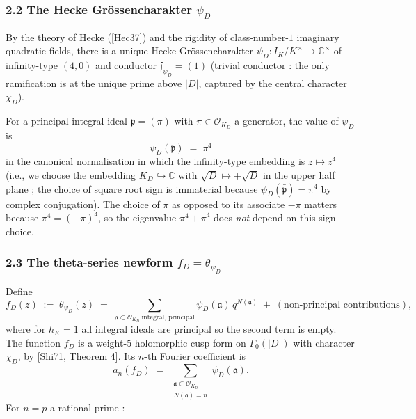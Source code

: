 \documentclass[
  11pt,
  a4paper,
]{amsart}
\begin{document}
\hypertarget{the-hecke-gruxf6ssencharakter-psi_d}{%
\subsubsection{\texorpdfstring{2.2 The Hecke Grössencharakter \(\psi_D\)}{2.2 The Hecke Grössencharakter \textbackslash psi\_D}}\label{the-hecke-gruxf6ssencharakter-psi_d}}

By the theory of Hecke ({[}Hec37{]}) and the rigidity of class-number-\(1\) imaginary quadratic fields, there is a unique Hecke Grössencharakter \(\psi_D : I_K / K^\times \to \mathbb{C}^\times\) of infinity-type \((4, 0)\) and conductor \(\mathfrak{f}_{\psi_D} = (1)\) (trivial conductor : the only ramification is at the unique prime above \(|D|\), captured by the central character \(\chi_D\)).

For a principal integral ideal \(\mathfrak{p} = (\pi)\) with \(\pi \in \mathcal{O}_{K_D}\) a generator, the value of \(\psi_D\) is
\[
\psi_D(\mathfrak{p}) \;=\; \pi^4
\]
in the canonical normalisation in which the infinity-type embedding is \(z \mapsto z^4\) (i.e., we choose the embedding \(K_D \hookrightarrow \mathbb{C}\) with \(\sqrt D \mapsto +\sqrt{D}\) in the upper half plane ; the choice of square root sign is immaterial because \(\psi_D(\bar{\mathfrak{p}}) = \bar\pi^4\) by complex conjugation). The choice of \(\pi\) as opposed to its associate \(-\pi\) matters because \(\pi^4 = (-\pi)^4\), so the eigenvalue \(\pi^4 + \bar\pi^4\) does \emph{not} depend on this sign choice.

\hypertarget{the-theta-series-newform-f_d-theta_psi_d}{%
\subsubsection{\texorpdfstring{2.3 The theta-series newform \(f_D = \theta_{\psi_D}\)}{2.3 The theta-series newform f\_D = \textbackslash theta\_\{\textbackslash psi\_D\}}}\label{the-theta-series-newform-f_d-theta_psi_d}}

Define
\[
f_D(z) \;:=\; \theta_{\psi_D}(z) \;=\; \sum_{\mathfrak{a} \subset \mathcal{O}_{K_D}\;\text{integral, principal}} \psi_D(\mathfrak{a})\, q^{N(\mathfrak{a})} \;+\; (\text{non-principal contributions}),
\]
where for \(h_K = 1\) all integral ideals are principal so the second term is empty. The function \(f_D\) is a weight-\(5\) holomorphic cusp form on \(\Gamma_0(|D|)\) with character \(\chi_D\), by {[}Shi71, Theorem 4{]}. Its \(n\)-th Fourier coefficient is
\[
a_n(f_D) \;=\; \sum_{\substack{\mathfrak{a} \subset \mathcal{O}_{K_D} \\ N(\mathfrak{a}) = n}} \psi_D(\mathfrak{a}).
\]
For \(n = p\) a rational prime :
\end{document}

